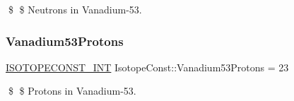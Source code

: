 \$ \$ Neutrons in Vanadium-\/53. \mbox{\label{group___isotope_const-_vanadium-_v53_ga5374d98ff29eb3145285dd4d61c99e6d}} 
\subsubsection{\texorpdfstring{Vanadium53\+Protons}{Vanadium53Protons}}
{\footnotesize\ttfamily \mbox{\hyperlink{group___isotope_const-_macros_ga5f18360b3e99483a35c32d789e62621c}{I\+S\+O\+T\+O\+P\+E\+C\+O\+N\+S\+T\+\_\+\+I\+NT}} Isotope\+Const\+::\+Vanadium53\+Protons = 23}

\$ \$ Protons in Vanadium-\/53. 